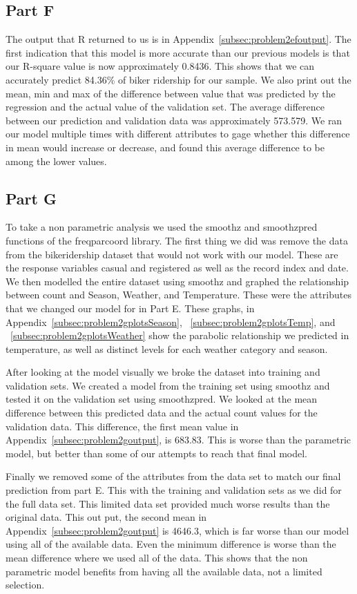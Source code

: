 \documentclass[11pt]{article}
\begin{document}
\subsection{Part F}
\label{subsec:2f}
The output that R returned to us is in Appendix~\ref{subsec:problem2efoutput}. The first indication that this model is more accurate than our previous models is that our R-square value is now approximately 0.8436. This shows that we can accurately predict 84.36\% of biker ridership for our sample. We also print out the mean, min and max of the difference between value that was predicted by the regression and the actual value of the validation set. The average difference between our prediction and validation data was approximately 573.579. We ran our model multiple times with different attributes to gage whether this difference in mean would increase or decrease, and found this average difference to be among the lower values. 
\subsection{Part G}
\label{subsec:2g}
To take a non parametric analysis we used the smoothz and smoothzpred functions of the freqparcoord library. The first thing we did was remove the data from the bikeridership dataset that would not work with our model. These are the response variables casual and registered as well as the record index and date. We then modelled the entire dataset using smoothz and graphed the relationship between count and Season, Weather, and Temperature. These were the attributes that we changed our model for in Part E. These graphs, in Appendix~\ref{subsec:problem2gplotsSeason}, ~\ref{subsec:problem2gplotsTemp}, and ~\ref{subsec:problem2gplotsWeather} show the parabolic relationship we predicted in temperature, as well as distinct levels for each weather category and season.

After looking at the model visually we broke the dataset into training and validation sets. We created a model from the training set using smoothz and tested it on the validation set using smoothzpred. We looked at the mean difference between this predicted data and the actual count values for the validation data. This difference, the first mean value in Appendix~\ref{subsec:problem2goutput}, is 683.83. This is worse than the parametric model, but better than some of our attempts to reach that final model.

Finally we removed some of the attributes from the data set to match our final prediction from part E. This with the training and validation sets as we did for the full data set. This limited data set provided much worse results than the original data. This out put, the second mean in Appendix~\ref{subsec:problem2goutput} is 4646.3, which is far worse than our model using all of the available data. Even the minimum difference is worse than the mean difference where we used all of the data. This shows that the non parametric model benefits from having all the available data, not a limited selection.
\end{document}
